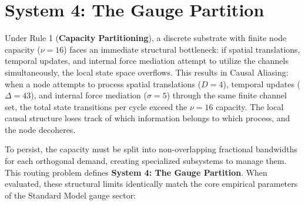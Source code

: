 
\section{System 4: The Gauge Partition}
\label{sec:capacity_partition}

Under Rule 1 (\textbf{Capacity Partitioning}), a discrete substrate with finite node capacity ($\nu=16$) faces an immediate structural bottleneck: if spatial translations, temporal updates, and internal force mediation attempt to utilize the channels simultaneously, the local state space overflows. This results in Causal Aliasing: when a node attempts to process spatial translations ($D=4$), temporal updates ($\Delta=43$), and internal force mediation ($\sigma=5$) through the same finite channel set, the total state transitions per cycle exceed the $\nu=16$ capacity. The local causal structure loses track of which information belongs to which process, and the node decoheres.

To persist, the capacity must be split into non-overlapping fractional bandwidths for each orthogonal demand, creating specialized subsystems to manage them. This routing problem defines \textbf{System 4: The Gauge Partition}. When evaluated, these structural limits identically match the core empirical parameters of the Standard Model gauge sector:

